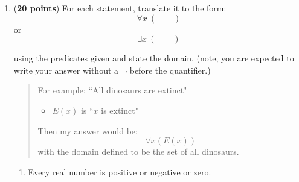 \documentclass[10pt,letterpaper,unboxed,cm]{article}
\begin{document}
\begin{enumerate}
 
    
\item ({\bf 20 points})
For each statement, translate it to the form:
$$\forall x~(\underline{~~~~~~~~}~)$$
or
$$\exists x~(\underline{~~~~~~~~}~)$$

using the predicates given and state the domain. (note, you are expected to write your answer without a $\neg$ before the quantifier.)
\begin{quote}
For example: ``All dinosaurs are extinct"
\begin{itemize}
\item
$E(x)$ is ``$x$ is extinct"
\end{itemize}
Then my answer would be:
$$\forall x (E(x))$$ with the domain defined to be the set of all dinosaurs.
\end{quote}
    
\begin{enumerate}
\item
Every real number is positive or negative or zero.


\end{enumerate}
\end{enumerate}
\end{document}
